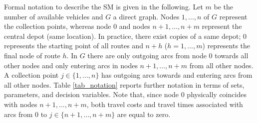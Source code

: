 \documentclass[authoryear,preprint,12pt]{elsarticle}
\begin{document}
Formal notation to describe the SM is given in the following.
Let $m$ be the number of available vehicles and $G$ a direct graph. Nodes $1,...,n$ of $G$ represent the collection points, whereas node $0$ and nodes $n+1,...,n+m$ represent the central depot (same location). In practice, there exist copies of a same depot; $0$ represents the starting point of all routes and $n+h$ ($h=1,...,m$) represents the final node of route $h$. In $G$  there are only outgoing arcs from node 0 towards all other nodes and only entering arcs in nodes $n+1,...,n+m$ from all other nodes. A collection point $j \in \{1,...,n\}$ has outgoing arcs towards and entering arcs from all other nodes.  Table \ref{tab_notation} reports further notation in terms of sets, parameters, and decision variables. Note that, since node $0$ physically coincides with nodes $n+1,...,n+m$, both travel costs and travel times associated with arcs from 0 to $j\in \{n+1,...,n+m\}$ are equal to zero. 
 
\end{document}
